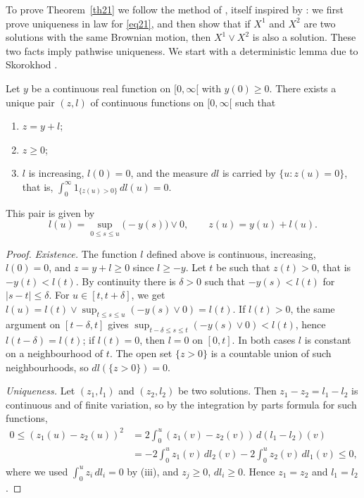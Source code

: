 To prove Theorem~\ref{th21} we follow the method of \citet{LeGall1983},
itself inspired by \citet{Perkins1982}: we first prove uniqueness in law for
\eqref{eq21}, and then show that if $X^1$ and $X^2$ are two solutions with the
same Brownian motion, then $X^1 \vee X^2$ is also a solution. These two facts
imply pathwise uniqueness. We start with a deterministic lemma due to
Skorokhod \citep[Lemma~VI.2.1]{RevuzYor1999}.

\begin{lemma}\label{lem:skorokhod}
	Let $y$ be a continuous real function on $[0,\infty[$ with
	$y(0)\geqslant 0$. There exists a unique pair $(z,l)$ of continuous functions
	on $[0,\infty[$ such that
	\begin{enumerate}[label=(\roman*)]
		\item $z = y + l$;
		\item $z \geqslant 0$;
		\item $l$ is increasing, $l(0) = 0$, and the measure $dl$ is carried by
		      $\{u : z(u) = 0\}$, that is, $\int_0^\infty 1_{\{z(u)>0\}}\,dl(u) = 0$.
	\end{enumerate}
	This pair is given by
	\[
		l(u)=\sup_{0\leqslant s \leqslant u} \big(-y(s)\big)\vee 0 , \qquad z(u) = y(u) + l(u).
	\]
\end{lemma}

\begin{proof}
	\emph{Existence.} The function $l$ defined above is continuous, increasing,
	$l(0) = 0$, and $z = y + l \geqslant 0$ since $l \geqslant -y$. Let $t$ be such
	that $z(t) > 0$, that is $-y(t) < l(t)$. By continuity there is $\delta > 0$
	such that $-y(s) < l(t)$ for $|s - t| \leqslant \delta$. For
	$u \in [t, t+\delta]$, we get
	$l(u) = l(t) \vee \sup_{t\leqslant s\leqslant u}(-y(s)\vee 0) = l(t)$. If
	$l(t) > 0$, the same argument on $[t-\delta, t]$ gives
	$\sup_{t-\delta\leqslant s\leqslant t}(-y(s)\vee 0) < l(t)$, hence
	$l(t-\delta) = l(t)$; if $l(t) = 0$, then $l = 0$ on $[0,t]$. In both cases $l$
	is constant on a neighbourhood of $t$. The open set $\{z > 0\}$ is a countable
	union of such neighbourhoods, so $dl(\{z>0\}) = 0$.

	\emph{Uniqueness.} Let $(z_1, l_1)$ and $(z_2, l_2)$ be two solutions. Then
	$z_1 - z_2 = l_1 - l_2$ is continuous and of finite variation, so by the
	integration by parts formula for such functions,
	\begin{align*}
		0\leqslant (z_1 (u)- z_2 (u))^2 & = 2\int_0^u (z_1(v)-z_2 (v))\,d(l_1-l_2)(v)               \\
		                                & = -2\int_0^u z_1 (v)\, dl_2(v)-2\int_0^u z_2(v)\,dl_1(v)\leqslant 0,
	\end{align*}
	where we used $\int_0^u z_i\,dl_i = 0$ by (iii), and $z_j \geqslant 0$,
	$dl_i\geqslant 0$. Hence $z_1 = z_2$ and $l_1 = l_2$.
\end{proof}

